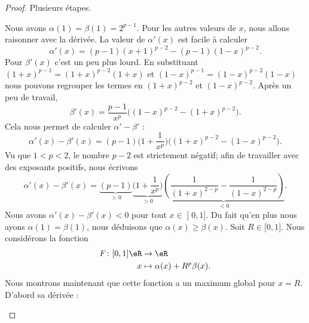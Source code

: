 \begin{proof}
    Plusieurs étapes.
    \begin{subproof}
        Nous avons \( \alpha(1)=\beta(1)=2^{p-1}\). Pour les autres valeurs de \( x\), nous allons raisonner avec la dérivée. La valeur de \( \alpha'(x)\) est facile à calculer
        \begin{equation}
            \alpha'(x)=(p-1)(x+1)^{p-2}-(p-1)(1-x)^{p-2}.
        \end{equation}
        Pour \( \beta'(x)\) c'est un peu plus lourd. En substituant \( (1+x)^{p-1}=(1+x)^{p-2}(1+x)\) et \( (1-x)^{p-1}=(1-x)^{p-2}(1-x)\) nous pouvons regrouper les termes en \( (1+x)^{p-2}\) et \( (1-x)^{p-2}\). Après un peu de travail,
        \begin{equation}
            \beta'(x)=\frac{ p-1 }{ x^p }\big( (1-x)^{p-2}-(1+x)^{p-2} \big).
        \end{equation}
        Cela nous permet de calculer \( \alpha'-\beta'\) :
        \begin{equation}
            \alpha'(x)-\beta'(x)=(p-1)\big( 1+\frac{1}{ x^p } \big)\big( (1+x)^{p-2}-(1-x)^{p-2} \big).
        \end{equation}
        Vu que \( 1<p<2\), le nombre \( p-2\) est strictement négatif; afin de travailler avec des exposants positifs, nous écrivons
        \begin{equation}
            \alpha'(x)-\beta'(x)=\underbrace{(p-1)}_{>0}\underbrace{\big( 1+\frac{1}{ x^p } \big)}_{>0}\underbrace{\left( \frac{1}{ (1+x)^{2-p}}-\frac{1}{ (1-x)^{2-p} }  \right)}_{<0}.
        \end{equation}
        Nous avons \( \alpha'(x)-\beta'(x)<0\) pour tout \( x\in \mathopen] 0 , 1 \mathclose]\). Du fait qu'en plus nous ayons \( \alpha(1)=\beta(1)\), nous déduisons que \( \alpha(x)\geq \beta(x)\).
        Soit \( R\in \mathopen[ 0 , 1 \mathclose]\). Nous considérons la fonction
        \begin{equation}
            \begin{aligned}
                F\colon \mathopen[ 0 , 1 \mathclose]\eR & \to \eR                        \\
                x                                       & \mapsto \alpha(x)+R^p\beta(x).
            \end{aligned}
        \end{equation}
        Nous montrons maintenant que cette fonction a un maximum global pour \( x=R\). D'abord sa dérivée :

\end{subproof}
\end{proof}
